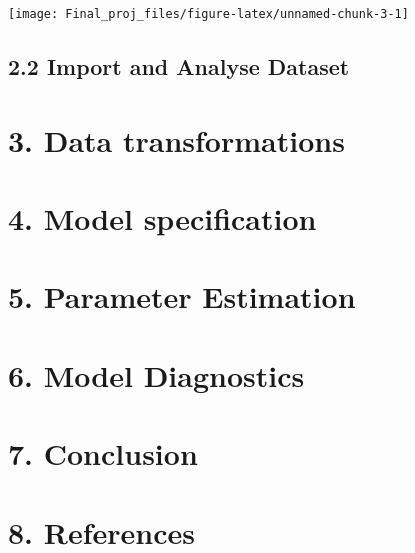 \documentclass[
]{article}
\begin{document}
\begin{center}\texttt{[image: Final\_proj\_files/figure-latex/unnamed-chunk-3-1]} \end{center}
\n

\hypertarget{import-and-analyse-dataset-1}{%
\subsection{2.2 Import and Analyse
Dataset}\label{import-and-analyse-dataset-1}}

\hypertarget{data-transformations}{%
\section{3. Data transformations}\label{data-transformations}}

\hypertarget{model-specification}{%
\section{4. Model specification}\label{model-specification}}

\hypertarget{parameter-estimation}{%
\section{5. Parameter Estimation}\label{parameter-estimation}}

\hypertarget{model-diagnostics}{%
\section{6. Model Diagnostics}\label{model-diagnostics}}

\hypertarget{conclusion}{%
\section{7. Conclusion}\label{conclusion}}

\hypertarget{references}{%
\section{8. References}\label{references}}
\end{document}
